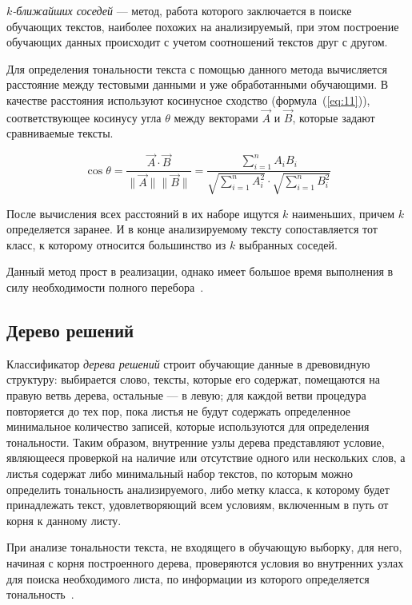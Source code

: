 \textit{$k$-ближайших соседей} --- метод, работа которого заключается в
поиске обучающих текстов, наиболее похожих на анализируемый, при этом построение
обучающих данных происходит с учетом соотношений текстов друг с другом.

Для определения тональности текста с помощью данного метода вычисляется
расстояние между тестовыми данными и уже обработанными обучающими. В качестве
расстояния используют косинусное сходство (формула~(\ref{eq:11})),
соответствующее косинусу угла $\theta$ между векторами $\vec{A}$ и $\vec{B}$,
которые задают сравниваемые тексты.

\begin{equation}\label{eq:11}
    \cos{\theta} = \frac{\vec{A} \cdot \vec{B}}{\|\vec{A}\|\|\vec{B}\|} =
    \frac{\sum\limits_{i=1}^n{A_iB_i}}{\sqrt{\sum\limits_{i=1}^n{A_i^2}} \cdot
    \sqrt{\sum\limits_{i=1}^n{B_i^2}}}
\end{equation}

После вычисления всех расстояний в их наборе ищутся $k$ наименьших, причем $k$
определяется заранее. И в конце анализируемому тексту сопоставляется тот класс,
к которому относится большинство из $k$ выбранных соседей.

Данный метод прост в реализации, однако имеет большое время выполнения в силу
необходимости полного перебора~\cite{article20}.

\subsection{Дерево решений}

Классификатор \textit{дерева решений} строит обучающие данные в древовидную
структуру: выбирается слово, тексты, которые его содержат, помещаются на правую
ветвь дерева, остальные --- в левую; для каждой ветви процедура повторяется до
тех пор, пока листья не будут содержать определенное минимальное количество
записей, которые используются для определения тональности. Таким образом,
внутренние узлы дерева представляют условие, являющееся проверкой на наличие
или отсутствие одного или нескольких слов, а листья содержат либо минимальный
набор текстов, по которым можно определить тональность анализируемого, либо
метку класса, к которому будет принадлежать текст, удовлетворяющий всем
условиям, включенным в путь от корня к данному листу.

При анализе тональности текста, не входящего в обучающую выборку, для него,
начиная с корня построенного дерева, проверяются условия во внутренних узлах для
поиска необходимого листа, по информации из которого определяется
тональность~\cite{article14}.

